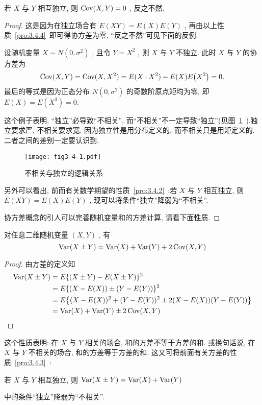 	\begin{property}\label{pro:3.4.5}
		若 $X$ 与 $Y$ 相互独立, 则 $\operatorname{Cov}(X,Y)=0$ , 反之不然.
		\begin{proof}
			这是因为在独立场合有 $E(XY)=E(X)E(Y)$ , 再由以上性质~\ref{pro:3.4.4}~即可得协方差为零. “反之不然”可见下面的反例.
			\begin{example}\label{exam:3.4.6}
				设随机变量 $X \sim N\left(0,\sigma^2\right)$ , 且令 $Y=X^2$ , 则 $X$ 与 $Y$ 不独立. 此时 $X$ 与 $Y$ 的协方差为
				\begin{equation*}
					\Cov(X, Y)=\Cov(X, X^2)=E(X\cdot X^2)-E(X)E\left( X^2 \right)=0.
				\end{equation*}
				最后的等式是因为正态分布 $N\left(0,\sigma^2\right)$ 的奇数阶原点矩均为零, 即 $E(X)=E\left( X^3 \right)=0.$
			\end{example}
			这个例子表明, “独立”必导致“不相关”, 而“不相关”不一定导致“独立”(见图~\ref{fig:3.4.1}~).独立要求严, 不相关要求宽. 因为独立性是用分布定义的, 而不相关只是用矩定义的. 二者之间的差别一定要认识到.
			\begin{figure}[htbp]
				\centering
				\texttt{[image: fig3-4-1.pdf]}
				\caption{不相关与独立的逻辑关系}\label{fig:3.4.1}
			\end{figure}

			另外可以看出, 前而有关数学期望的性质~\ref{pro:3.4.2}~:若 $X$ 与 $Y$ 相互独立, 则 $E(XY)=E(X)E(Y)$ , 现可以将条件“独立”降弱为“不相关”.

			协方差概念的引人可以完善随机变量和的方差计算, 请看下面性质.
		\end{proof}
	\end{property}
	\begin{property}\label{pro:3.4.6}
		对任意二维随机变量 $(X,Y)$ , 有
		\begin{equation}\label{eq:3.4.8}
			\operatorname{Var}(X \pm Y)=\operatorname{Var}(X)+\operatorname{Var}(Y)+2 \operatorname{Cov}(X, Y)
		\end{equation}
		\begin{proof}
			由方差的定义知
			\begin{align*}
				\Var(X \pm Y)&=E\{(X \pm Y)-E(X \pm Y)\}^{2} \\
				&=E\{(X-E(X)) \pm(Y-E(Y))\}^{2} \\
				&=E\left\{(X-E(X))^{2}+(Y-E(Y))^{2} \pm 2(X-E(X))(Y-E(Y))\right\} \\
			  &=\Var(X)+\Var(Y) \pm 2 \Cov(X, Y)
			\end{align*}
		\end{proof}
	\end{property}
	这个性质表明: 在 $X$ 与 $Y$ 相关的场合, 和的方差不等于方差的和. 或换句话说, 在 $X$ 与 $Y$ 不相关的场合, 和的方差等于方差的和. 这又可将前面有关方差的性质~\ref{pro:3.4.3}~:
	\begin{center}
		若 $X$ 与 $Y$ 相互独立, 则 $\operatorname{Var}(X \pm Y)=\operatorname{Var}(X)+\operatorname{Var}(Y)$
	\end{center}
	中的条件“独立”降弱为“不相关”.

